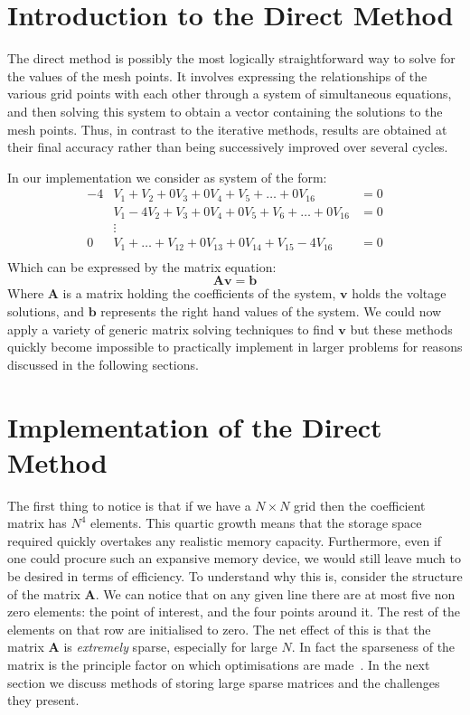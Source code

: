 \documentclass[a4paper]{article}
\newcommand{\mat}[1]{\mathbf{#1}}
\renewcommand{\vec}[1]{\bm{#1}}
\begin{document}
%

\section{Introduction to the Direct Method}
The direct method is possibly the most logically straightforward way to solve
for the values of the mesh points. It involves expressing the relationships of
the various grid points with each other through a system of simultaneous
equations, and then solving this system to obtain a vector containing the
solutions to the mesh points. Thus, in contrast to the iterative methods,
results are obtained at their final accuracy rather than being successively
improved over several cycles.

In our implementation we consider as system of the form:
\begin{align*}
	-4&V_1+V_2+0V_3+0V_4+V_5+\dots+0V_{16}&=0\\
	&V_1-4V_2+V_3+0V_4+0V_5+V_6+\dots+0V_{16}&=0\\
	&\vdots\\
	0&V_1+\dots+V_{12}+0V_{13}+0V_{14}+V_{15}-4V_{16}&=0\\
\end{align*}
Which can be expressed by the matrix equation:
\begin{equation}
	\mat{A}\vec{v}=\vec{b}
	\label{matEq}
\end{equation}
Where $\mat{A}$ is a matrix holding the coefficients of the system, $\vec{v}$
holds the voltage solutions, and $\vec{b}$ represents the right hand values of
the system. We could now apply a variety of generic matrix solving techniques
to find $\vec{v}$ but these methods quickly become impossible to practically
implement in larger problems for reasons discussed in the following sections.

\section{Implementation of the Direct Method}
The first thing to notice is that if we have a $N\times N$ grid then the
coefficient matrix has $N^4$ elements. This quartic growth means that the
storage space required quickly overtakes any realistic memory capacity.
Furthermore, even if one could procure such an expansive memory device, we
would still leave much to be desired in terms of efficiency. To understand why
this is, consider the structure of the matrix $\mat{A}$. We can notice that on
any given line there are at most five non zero elements: the point of interest,
and the four points around it. The rest of the elements on that row are
initialised to zero. The net effect of this is that the matrix $\mat{A}$ is
\emph{extremely} sparse, especially for large $N$. In fact the sparseness of
the matrix is the principle factor on which optimisations are made~\cite{NR}.
In the next section we discuss methods of storing large sparse matrices and the
challenges they present.
\end{document}
